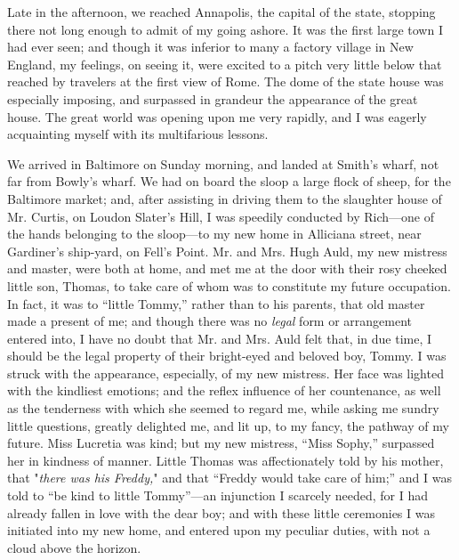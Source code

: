 Late in the afternoon, we reached Annapolis, the capital of the state,
stopping there not long enough to admit of my going ashore. It was the
first large town I had ever seen; and though it was inferior to many a
factory village in New England, my feelings, on seeing it, were excited
to a pitch very little below that reached by travelers at the first view
of Rome. The dome of the state house was especially imposing, and
surpassed in grandeur the appearance of the great house. The great world
was opening upon me very rapidly, and I was eagerly acquainting myself
with its multifarious lessons.

We arrived in Baltimore on Sunday morning, and landed at Smith's wharf,
not far from Bowly's wharf. We had on board the sloop a large flock of
sheep, for the Baltimore market; and, after assisting in driving them to
the slaughter house of Mr. Curtis, on Loudon Slater's Hill, I was
speedily conducted by Rich---one of the hands belonging to the
sloop---to my new home in Alliciana street, near Gardiner's ship-yard,
on Fell's Point. Mr. and Mrs. Hugh Auld, my new mistress and master,
were both at home, and met me at the door with their rosy cheeked little
son, Thomas, to take {}care of whom was to constitute my future
occupation. In fact, it was to ``little Tommy,'' rather than to his
parents, that old master made a present of me; and though there was no
\emph{legal} form or arrangement entered into, I have no doubt that Mr.
and Mrs. Auld felt that, in due time, I should be the legal property of
their bright-eyed and beloved boy, Tommy. I was struck with the
appearance, especially, of my new mistress. Her face was lighted with
the kindliest emotions; and the reflex influence of her countenance, as
well as the tenderness with which she seemed to regard me, while asking
me sundry little questions, greatly delighted me, and lit up, to my
fancy, the pathway of my future. Miss Lucretia was kind; but my new
mistress, ``Miss Sophy,'' surpassed her in kindness of manner. Little
Thomas was affectionately told by his mother, that "\emph{there was his
Freddy,}" and that ``Freddy would take care of him;'' and I was told to
``be kind to little Tommy''---an injunction I scarcely needed, for I had
already fallen in love with the dear boy; and with these little
ceremonies I was initiated into my new home, and entered upon my
peculiar duties, with not a cloud above the horizon.


